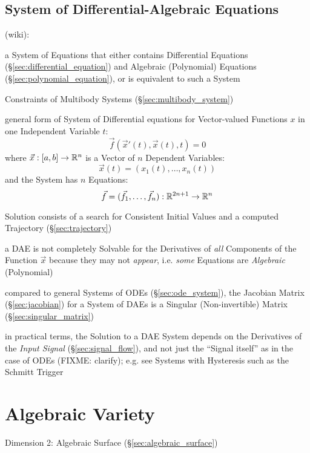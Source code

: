 \subsection{System of Differential-Algebraic Equations}\label{sec:dae_system}

(wiki):

a System of Equations that either contains Differential Equations
(\S\ref{sec:differential_equation}) and Algebraic (Polynomial) Equations
(\S\ref{sec:polynomial_equation}), or is equivalent to such a System

\fist Constraints of Multibody Systems (\S\ref{sec:multibody_system})

general form of System of Differential equations for Vector-valued Functions
$x$ in one Independent Variable $t$:
\[
  \vec{f}(\vec{x}'(t), \vec{x}(t), t) = 0
\]
where $\vec{x} : [a,b] \rightarrow \mathbb{R}^n$ is a Vector of $n$ Dependent
Variables:
\[
  \vec{x}(t) = (x_1(t), \ldots, x_n(t))
\]
and the System has $n$ Equations:
\[
  \vec{f} = (\vec{f}_1, \ldots, \vec{f}_n) : \mathbb{R}^{2n+1} \rightarrow \mathbb{R}^n
\]

Solution consists of a search for Consistent Initial Values and a computed
Trajectory (\S\ref{sec:trajectory})

a DAE is not completely Solvable for the Derivatives of \emph{all} Components
of the Function $\vec{x}$ because they may not \emph{appear}, i.e. \emph{some}
Equations are \emph{Algebraic} (Polynomial)

compared to general Systems of ODEs (\S\ref{sec:ode_system}), the Jacobian
Matrix (\S\ref{sec:jacobian}) for a System of DAEs is a Singular
(Non-invertible) Matrix (\S\ref{sec:singular_matrix})

in practical terms, the Solution to a DAE System depends on the Derivatives of
the \emph{Input Signal} (\S\ref{sec:signal_flow}), and not just the ``Signal
itself'' as in the case of ODEs
(FIXME: clarify); e.g. see Systems with Hysteresis such as the Schmitt Trigger



\section{Algebraic Variety}\label{sec:algebraic_variety}

Dimension 2: Algebraic Surface (\S\ref{sec:algebraic_surface})

